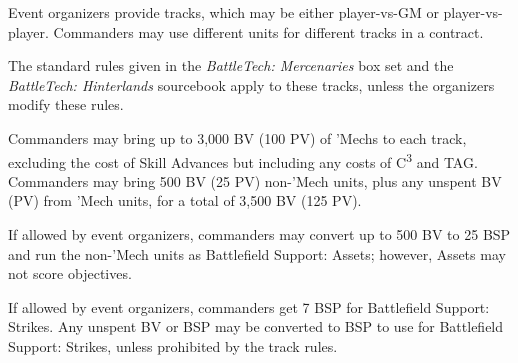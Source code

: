 Event organizers provide tracks, which may be either player-vs-GM or player-vs-player.
Commanders may use different units for different tracks in a contract.

The standard rules given in the \emph{BattleTech: Mercenaries} box set and the \emph{BattleTech: Hinterlands} sourcebook apply to these tracks, unless the organizers modify these rules.

Commanders may bring up to 3,000 BV (100 PV) of 'Mechs to each track, excluding the cost of Skill Advances but including any costs of C\textsuperscript{3} and TAG.
Commanders may bring 500 BV (25 PV) non-'Mech units, plus any unspent BV (PV) from 'Mech units, for a total of 3,500 BV (125 PV).

If allowed by event organizers, commanders may convert up to 500 BV to 25 BSP and run the non-'Mech units as Battlefield Support: Assets; however, Assets may not score objectives.

If allowed by event organizers, commanders get 7 BSP for Battlefield Support: Strikes.
Any unspent BV or BSP may be converted to BSP to use for Battlefield Support: Strikes, unless prohibited by the track rules.
